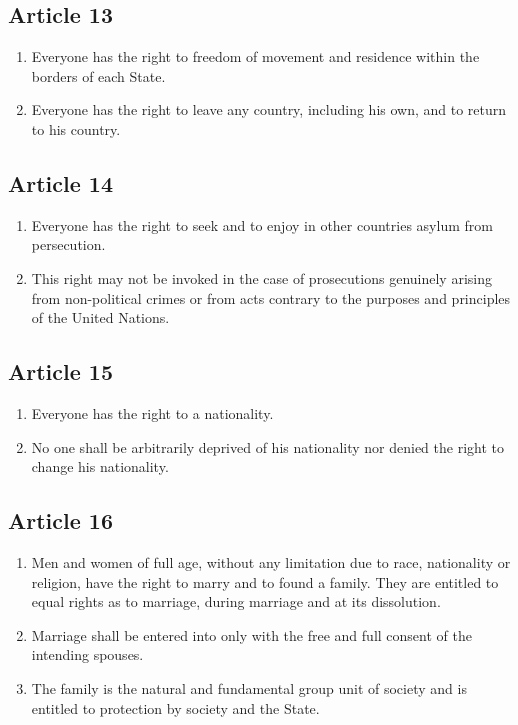 \documentclass[
  titlepage,
  openright,
  DIV=calc,
  toc=listof,
  listof=nochaptergap]{scrbook}
\begin{document}
\subsection{Article 13}\label{article-13-1}

\begin{enumerate}
\def\labelenumi{\arabic{enumi}.}
\item
  Everyone has the right to freedom of movement and residence within the
  borders of each State.
\item
  Everyone has the right to leave any country, including his own, and to
  return to his country.
\end{enumerate}

\subsection{Article 14}\label{article-14-1}

\begin{enumerate}
\def\labelenumi{\arabic{enumi}.}
\item
  Everyone has the right to seek and to enjoy in other countries asylum
  from persecution.
\item
  This right may not be invoked in the case of prosecutions genuinely
  arising from non-political crimes or from acts contrary to the
  purposes and principles of the United Nations.
\end{enumerate}

\subsection{Article 15}\label{article-15-1}

\begin{enumerate}
\def\labelenumi{\arabic{enumi}.}
\item
  Everyone has the right to a nationality.
\item
  No one shall be arbitrarily deprived of his nationality nor denied the
  right to change his nationality.
\end{enumerate}

\subsection{Article 16}\label{article-16-1}

\begin{enumerate}
\def\labelenumi{\arabic{enumi}.}
\item
  Men and women of full age, without any limitation due to race,
  nationality or religion, have the right to marry and to found a
  family. They are entitled to equal rights as to marriage, during
  marriage and at its dissolution.
\item
  Marriage shall be entered into only with the free and full consent of
  the intending spouses.
\item
  The family is the natural and fundamental group unit of society and is
  entitled to protection by society and the State.
\end{enumerate}
\end{document}
